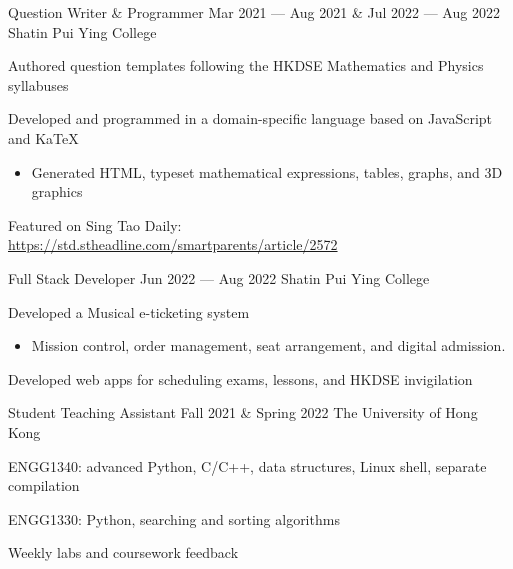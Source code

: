 \jobTitle
{Question Writer \& Programmer}
{Mar 2021 --- Aug 2021 \& Jul 2022 --- Aug 2022 }
{Shatin Pui Ying College}
\begin{descitemize}
    \item Authored question templates following the HKDSE Mathematics and Physics syllabuses
    \item Developed and programmed in a domain-specific language based on JavaScript and KaTeX
    \begin{itemize}
        \item Generated HTML, typeset mathematical expressions, tables, graphs, and 3D graphics
    \end{itemize}
    \item Featured on Sing Tao Daily: \href{https://std.stheadline.com/smartparents/article/2572}{https://std.stheadline.com/smartparents/article/2572}
\end{descitemize}

\jobTitle
{Full Stack Developer}
{Jun 2022 --- Aug 2022}
{Shatin Pui Ying College}
\begin{descitemize}
    \item Developed a Musical e-ticketing system
    \begin{itemize}
        \item Mission control, order management, seat arrangement, and digital admission.
    \end{itemize}
    \item Developed web apps for scheduling exams, lessons, and HKDSE invigilation
\end{descitemize}

\jobTitle
{Student Teaching Assistant}
{Fall 2021 \& Spring 2022}
{The University of Hong Kong}
\begin{descitemize}
    \item ENGG1340: advanced Python, C/C++, data structures, Linux shell, separate compilation
    \item ENGG1330: Python, searching and sorting algorithms
    \item Weekly labs and coursework feedback
\end{descitemize}